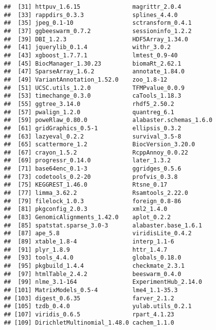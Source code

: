 \documentclass[
  11pt,
  a4paper,
]{article}
\begin{document}
\begin{verbatim}
##  [31] httpuv_1.6.15               magrittr_2.0.4             
##  [33] rappdirs_0.3.3              splines_4.4.0              
##  [35] jpeg_0.1-10                 sctransform_0.4.1          
##  [37] ggbeeswarm_0.7.2            sessioninfo_1.2.2          
##  [39] DBI_1.2.3                   HDF5Array_1.34.0           
##  [41] jquerylib_0.1.4             withr_3.0.2                
##  [43] xgboost_1.7.7.1             lmtest_0.9-40              
##  [45] BiocManager_1.30.23         biomaRt_2.62.1             
##  [47] SparseArray_1.6.2           annotate_1.84.0            
##  [49] VariantAnnotation_1.52.0    zoo_1.8-12                 
##  [51] UCSC.utils_1.2.0            TFMPvalue_0.0.9            
##  [53] timechange_0.3.0            caTools_1.18.3             
##  [55] ggtree_3.14.0               rhdf5_2.50.2               
##  [57] pwalign_1.2.0               quantreg_6.1               
##  [59] poweRlaw_0.80.0             alabaster.schemas_1.6.0    
##  [61] gridGraphics_0.5-1          ellipsis_0.3.2             
##  [63] lazyeval_0.2.2              survival_3.5-8             
##  [65] scattermore_1.2             BiocVersion_3.20.0         
##  [67] crayon_1.5.2                RcppAnnoy_0.0.22           
##  [69] progressr_0.14.0            later_1.3.2                
##  [71] base64enc_0.1-3             ggridges_0.5.6             
##  [73] codetools_0.2-20            profvis_0.3.8              
##  [75] KEGGREST_1.46.0             Rtsne_0.17                 
##  [77] limma_3.62.2                Rsamtools_2.22.0           
##  [79] filelock_1.0.3              foreign_0.8-86             
##  [81] pkgconfig_2.0.3             xml2_1.4.0                 
##  [83] GenomicAlignments_1.42.0    aplot_0.2.2                
##  [85] spatstat.sparse_3.0-3       alabaster.base_1.6.1       
##  [87] ape_5.8                     viridisLite_0.4.2          
##  [89] xtable_1.8-4                interp_1.1-6               
##  [91] plyr_1.8.9                  httr_1.4.7                 
##  [93] tools_4.4.0                 globals_0.18.0             
##  [95] pkgbuild_1.4.4              checkmate_2.3.1            
##  [97] htmlTable_2.4.2             beeswarm_0.4.0             
##  [99] nlme_3.1-164                ExperimentHub_2.14.0       
## [101] MatrixModels_0.5-4          lme4_1.1-35.3              
## [103] digest_0.6.35               farver_2.1.2               
## [105] tzdb_0.4.0                  yulab.utils_0.2.1          
## [107] viridis_0.6.5               rpart_4.1.23               
## [109] DirichletMultinomial_1.48.0 cachem_1.1.0               

\end{verbatim}
\end{document}
